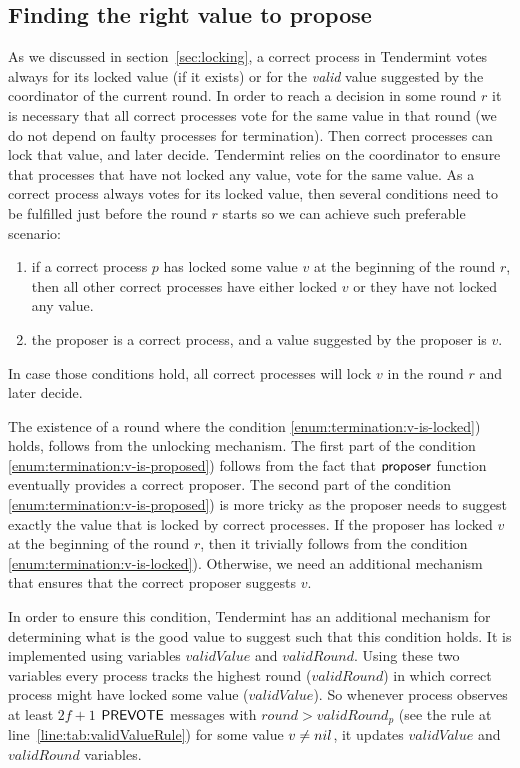 \subsection{Finding the right value to propose}
\label{sec:findRighValue}

As we discussed in section~\ref{sec:locking}, a correct process in Tendermint votes always for its locked value (if it exists) or for the \emph{valid} value suggested by the coordinator of the current round. In order to reach a decision in some round $r$ it is necessary that all correct processes vote for the same value in that round (we do not depend on faulty processes for termination). Then correct processes can lock that value, and later decide. Tendermint relies on the coordinator to ensure that processes that have not locked any value, vote for the same value. As a correct process always votes for its locked value, then several conditions need to be fulfilled just before the round $r$ starts so we can achieve such preferable scenario:

\begin{enumerate}
	\item if a correct process $p$ has locked some value $v$ at the beginning of the round $r$, then all other correct processes have either locked $v$ or they have not locked any value. \label{enum:termination:v-is-locked}
	\item the proposer is a correct process, and a value suggested by the proposer is $v$. \label{enum:termination:v-is-proposed}
\end{enumerate}

In case those conditions hold, all correct processes will lock $v$ in the round $r$ and later decide. 

The existence of a round where the condition \ref{enum:termination:v-is-locked}) holds, follows from the unlocking mechanism. The first part of the condition \ref{enum:termination:v-is-proposed}) follows from the fact that $\mathsf{proposer}$ function eventually provides a correct proposer. The second part of the condition \ref{enum:termination:v-is-proposed}) is more tricky as the proposer needs to suggest exactly the value that is locked by correct processes. If the proposer has locked $v$ at the beginning of the round $r$, then it trivially follows from the condition \ref{enum:termination:v-is-locked}). Otherwise, we need an additional mechanism that ensures that the correct proposer suggests $v$. 

In order to ensure this condition, Tendermint has an additional mechanism for determining what is the good value to suggest such that this condition holds. It is implemented using variables $validValue$ and $validRound$. Using these two variables every process tracks the highest round ($validRound$) in which correct process might have locked some value ($validValue$). So whenever process observes at least $2f+1$ $\mathsf{PREVOTE}$ messages with $round > validRound_p$ (see the rule at line~\ref{line:tab:validValueRule}) for some value $v \neq nil$,
it updates $validValue$ and $validRound$ variables.

